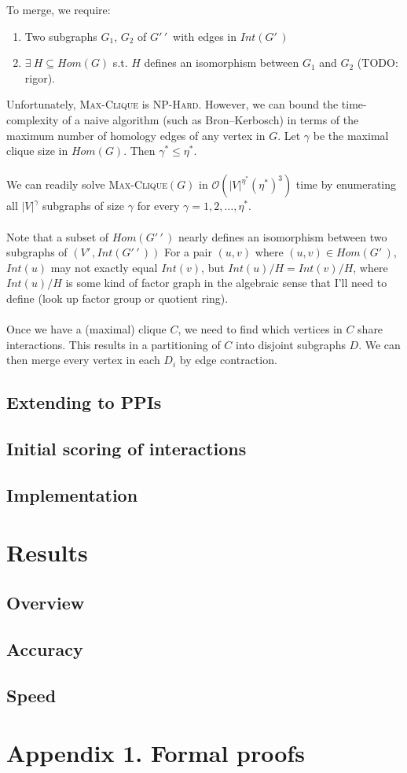 \documentclass[11pt]{article}
\begin{document}
To merge, we require:
\begin{enumerate}
\item Two subgraphs $G_1$, $G_2$ of $G'\,\!'\,\!$ with edges in $Int(G'\,\!)$
\item $\exists \: H \subseteq Hom(G)$ s.t. $H$ defines an isomorphism between $G_1$ and $G_2$ (TODO: rigor).
\end{enumerate}
Unfortunately, \textsc{Max-Clique} is \textsc{NP-Hard}. However, we can bound the time-complexity of a naive algorithm (such as Bron--Kerbosch) in terms of the maximum number of homology edges of any vertex in $G$. Let $\gamma$ be the maximal clique size in $Hom(G)$. Then $\gamma^* \leq \eta^*$.\\\\
We can readily solve \textsc{Max-Clique}$(G)$ in $\mathcal O(|V|^{\eta^*}(\eta^*)^3)$ time by enumerating all $|V|^{\gamma}$ subgraphs of size $\gamma$ for every $\gamma = 1, 2, \ldots, \eta^*$.\\\\
Note that a subset of $Hom(G'\,\!'\,\!)$ nearly defines an isomorphism between two subgraphs of $(V'\,\!, Int(G'\,\!'\,\!))$ For a pair $(u,v)$ where $(u,v) \in Hom(G'\,\!)$, $Int(u)$ may not exactly equal $Int(v)$, but $Int(u) / H = Int(v) / H$, where $Int(u) / H$ is some kind of factor graph in the algebraic sense that I'll need to define (look up factor group or quotient ring).\\\\
Once we have a (maximal) clique $C$, we need to find which vertices in $C$ share interactions. This results in a partitioning of $C$ into disjoint subgraphs $D$. We can then merge every vertex in each $D_i$ by edge contraction.

\subsection*{Extending to PPIs}

\subsection*{Initial scoring of interactions}

\subsection*{Implementation}

\section*{Results}

\subsection*{Overview}

\subsection*{Accuracy}

\subsection*{Speed}

\section*{Appendix 1. Formal proofs}
\end{document}
